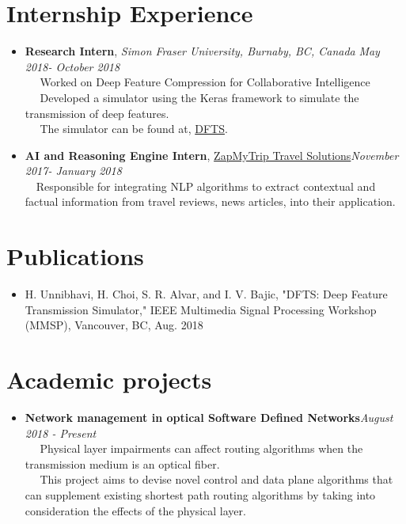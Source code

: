 \documentclass[margin, centered]{res}
\begin{document}
\begin{resume}
\section{\textbf{Internship Experience}}
\begin{itemize}
\item \textbf{Research Intern}, \textit{Simon Fraser University, Burnaby, BC, Canada}
\hfill\textit{May 2018- October 2018}\\
~\textbullet~ Worked on Deep Feature Compression for Collaborative Intelligence\\
~\textbullet~ Developed a simulator using the Keras framework to simulate the transmission of deep features.\\
~\textbullet~ The simulator can be found at, \href{https://github.com/SFU-Multimedia-Lab/DFTS}{DFTS}.
\end{itemize}
\begin{itemize}
\item \textbf{AI and Reasoning Engine Intern}, \href{https://www.voyazer.net/}{ZapMyTrip Travel Solutions}\hfill\textit{November 2017- January 2018}\\
~\textbullet~Responsible for integrating NLP algorithms to extract contextual and factual information from travel reviews, news articles, into their application.
\end{itemize}

\section{\textbf{Publications}}
\begin{itemize}
\item H. Unnibhavi, H. Choi, S. R. Alvar, and I. V. Bajic, "DFTS: Deep Feature Transmission Simulator," IEEE Multimedia Signal Processing Workshop (MMSP), Vancouver, BC, Aug. 2018
\end{itemize}

\section{\textbf{Academic projects}}
\begin{itemize}
\item \textbf{Network management in optical Software Defined Networks}\hfill\textit{August 2018 - Present}\\
~\textbullet~ Physical layer impairments can affect routing algorithms when the transmission medium is an optical fiber.\\
~\textbullet~ This project aims to devise novel control and data plane algorithms that can supplement existing shortest path routing algorithms by taking into consideration the effects of the physical layer.\\
\end{itemize}


\end{resume}
\end{document}
